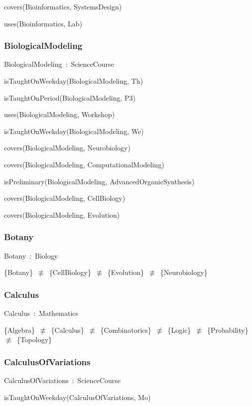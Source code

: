 \documentclass{article}
\begin{document}
covers(Bioinformatics, SystemsDesign)

uses(Bioinformatics, Lab)

\subsubsection*{BiologicalModeling}

BiologicalModeling~:~ScienceCourse

isTaughtOnWeekday(BiologicalModeling, Th)

isTaughtOnPeriod(BiologicalModeling, P3)

uses(BiologicalModeling, Workshop)

isTaughtOnWeekday(BiologicalModeling, We)

covers(BiologicalModeling, Neurobiology)

covers(BiologicalModeling, ComputationalModeling)

isPreliminary(BiologicalModeling, AdvancedOrganicSynthesis)

covers(BiologicalModeling, CellBiology)

covers(BiologicalModeling, Evolution)

\subsubsection*{Botany}

Botany~:~Biology

\{Botany\}~\ensuremath{\not\equiv}~\{CellBiology\}~\ensuremath{\not\equiv}~\{Evolution\}~\ensuremath{\not\equiv}~\{Neurobiology\}

\subsubsection*{Calculus}

Calculus~:~Mathematics

\{Algebra\}~\ensuremath{\not\equiv}~\{Calculus\}~\ensuremath{\not\equiv}~\{Combinatorics\}~\ensuremath{\not\equiv}~\{Logic\}~\ensuremath{\not\equiv}~\{Probability\}~\ensuremath{\not\equiv}~\{Topology\}

\subsubsection*{CalculusOfVariations}

CalculusOfVariations~:~ScienceCourse

isTaughtOnWeekday(CalculusOfVariations, Mo)
\end{document}
